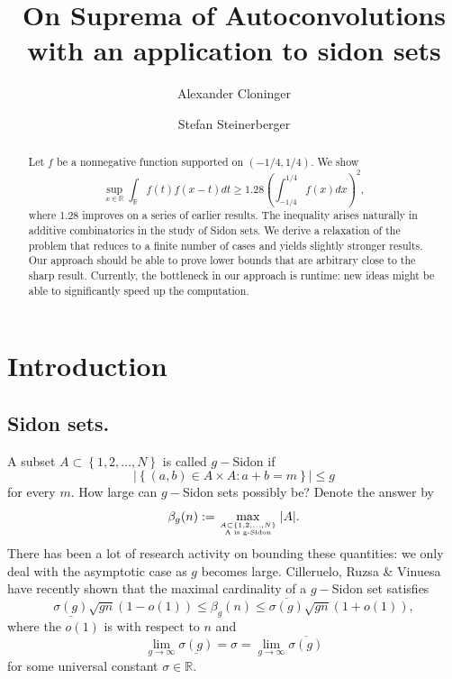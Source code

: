 \documentclass[10pt]{amsart}
\begin{document}
\title[]{On Suprema of Autoconvolutions \\with an application to sidon sets}
\author{Alexander Cloninger}
\address[Alexander Cloninger]{Department of Mathematics, Program in Applied Mathematics, Yale University, New Haven, CT 06510, USA}

\author{Stefan Steinerberger}
\address[Stefan Steinerberger]{Department of Mathematics, Yale University, 06511 New Haven, CT, USA}

\begin{abstract} 
Let $f$ be a nonnegative function supported on $(-1/4, 1/4)$. We show
$$ \sup_{x \in \mathbb{R}}{\int_{\mathbb{R}}{f(t)f(x-t)dt}} \geq 1.28\left(\int_{-1/4}^{1/4}{f(x)dx} \right)^2,$$
where 1.28 improves on a series of earlier results. 
The inequality arises naturally in additive 
combinatorics in the study of Sidon sets. We derive a relaxation of the problem that reduces to a finite number of cases and yields slightly stronger results. Our approach should be able to prove lower bounds that are arbitrary close to the sharp result. Currently, the bottleneck in our approach is runtime: new ideas might be able to significantly speed up the computation.
\end{abstract}
\maketitle

\section{Introduction}
\subsection{Sidon sets.}
A subset $A \subset \left\{1, 2, \dots, N\right\}$ is called $g-$Sidon if 
$$ | \left\{(a,b) \in A\times A: a+b=m\right\}| \leq g$$
for every $m$. How large can $g-$Sidon sets possibly be? Denote the answer by
$$ \beta_g(n) := \max_{A \subset \left\{1, 2, \dots, N\right\} \atop \mbox{\tiny A is g-Sidon}}{|A|}.$$
There has been a lot of research activity on bounding these quantities: we only deal with the asymptotic
case as $g$ becomes large. Cilleruelo, Ruzsa \& Vinuesa \cite{cill} have recently shown that the maximal cardinality of a $g-$Sidon set satisfies
$$\underline{\sigma(g)}\sqrt{gn}(1-o(1)) \leq \beta_g(n) \leq \overline{\sigma(g)}\sqrt{gn}(1+o(1)),$$
where the $o(1)$ is with respect to $n$ and 
$$ \lim_{g \rightarrow \infty}{\underline{\sigma(g)}} = \sigma = \lim_{g \rightarrow \infty}{\overline{\sigma(g)}}$$
for some universal constant $\sigma \in \mathbb{R}$. 
\end{document}
